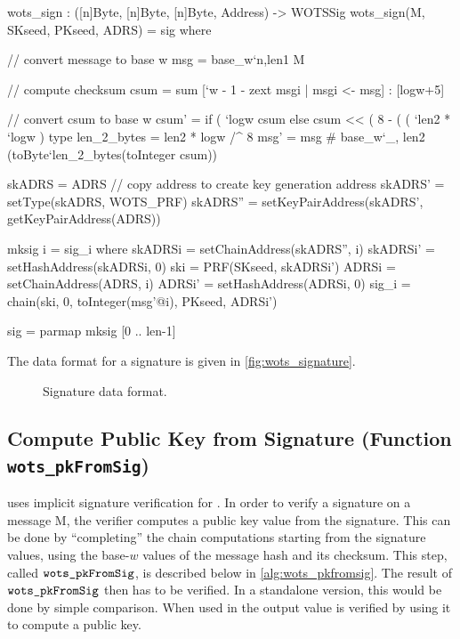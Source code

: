\begin{code}
  wots_sign : ([n]Byte, [n]Byte, [n]Byte, Address) -> WOTSSig
  wots_sign(M, SKseed, PKseed, ADRS) = sig where

    // convert message to base w
    msg = base_w`{n,len1} M

    // compute checksum
    csum = sum [`w - 1 - zext msgi | msgi <- msg] : [logw+5]

    // convert csum to base w
    csum' =
      if ( `logw%
        csum
      else
        csum << ( 8 - ( ( `len2 * `logw ) %
    type len_2_bytes = len2 * logw /^ 8
    msg' = msg # base_w`{_, len2} (toByte`{len_2_bytes}(toInteger csum))

    skADRS = ADRS // copy address to create key generation address
    skADRS' = setType(skADRS, WOTS_PRF)
    skADRS'' = setKeyPairAddress(skADRS', getKeyPairAddress(ADRS))

    mksig i = sig_i where
      skADRSi = setChainAddress(skADRS'', i)
      skADRSi' = setHashAddress(skADRSi, 0)
      ski = PRF(SKseed, skADRSi')
      ADRSi = setChainAddress(ADRS, i)
      ADRSi' = setHashAddress(ADRSi, 0)
      sig_i = chain(ski, 0, toInteger(msg'@i), PKseed, ADRSi')

    sig = parmap mksig [0 .. len-1]
\end{code}

The data format for a signature is given in \autoref{fig:wots_signature}.

\begin{figure}[h!]
  \centering
  \caption{\wotsp Signature data format.}
  \label{fig:wots_signature}
\end{figure}

\subsection{\wotsp Compute Public Key from Signature (Function \texttt{wots\_pkFromSig})}
\spx uses implicit signature verification for \wotsp. In order to verify a 
\wotsp signature \wotssig on a message M, the verifier
computes a \wotsp public key value from the signature. This can be
done by ``completing'' the chain computations starting from the
signature values, using the base-$w$ values of the message hash and its
checksum. This step, called $\texttt{wots\_pkFromSig}$, is described below in
\autoref{alg:wots_pkfromsig}. The result of $\texttt{wots\_pkFromSig}$ 
then has to be verified. In a standalone version, this would be done by simple 
comparison. When used in \spx the output value is verified by using it to 
compute a \spx public key. 

